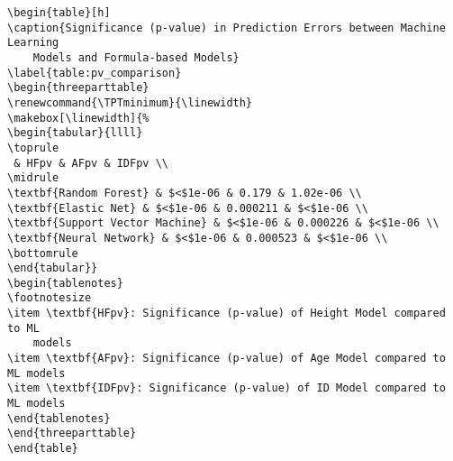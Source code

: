 \documentclass[11pt]{article}
\begin{document}
\begin{Verbatim}[tabsize=4]
\begin{table}[h]
\caption{Significance (p-value) in Prediction Errors between Machine Learning
	Models and Formula-based Models}
\label{table:pv_comparison}
\begin{threeparttable}
\renewcommand{\TPTminimum}{\linewidth}
\makebox[\linewidth]{%
\begin{tabular}{llll}
\toprule
 & HFpv & AFpv & IDFpv \\
\midrule
\textbf{Random Forest} & $<$1e-06 & 0.179 & 1.02e-06 \\
\textbf{Elastic Net} & $<$1e-06 & 0.000211 & $<$1e-06 \\
\textbf{Support Vector Machine} & $<$1e-06 & 0.000226 & $<$1e-06 \\
\textbf{Neural Network} & $<$1e-06 & 0.000523 & $<$1e-06 \\
\bottomrule
\end{tabular}}
\begin{tablenotes}
\footnotesize
\item \textbf{HFpv}: Significance (p-value) of Height Model compared to ML
	models
\item \textbf{AFpv}: Significance (p-value) of Age Model compared to ML models
\item \textbf{IDFpv}: Significance (p-value) of ID Model compared to ML models
\end{tablenotes}
\end{threeparttable}
\end{table}

\end{Verbatim}




\end{document}
